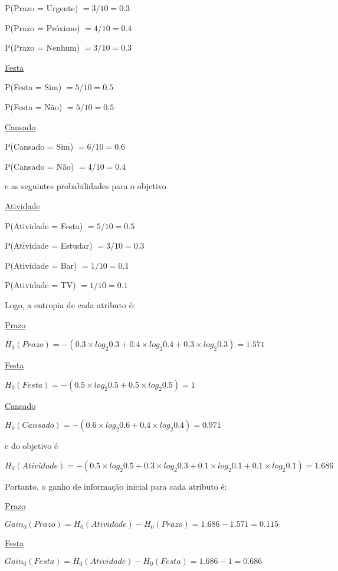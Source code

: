 \documentclass{article}
\begin{document}
\qquad P(Prazo = Urgente) $= 3/10 = 0.3$

\qquad P(Prazo = Próximo) $= 4/10 = 0.4$

\qquad P(Prazo = Nenhum) $= 3/10 = 0.3$

\bigskip
\quad \underline{Festa}

\qquad P(Festa = Sim) $= 5/10 = 0.5$

\qquad P(Festa = Não) $= 5/10 = 0.5$

\bigskip
\quad \underline{Cansado}

\qquad P(Cansado = Sim) $= 6/10 = 0.6$

\qquad P(Cansado = Não) $= 4/10 = 0.4$

\bigskip
\quad e as seguintes probabilidades para o objetivo

\quad \underline{Atividade}

\qquad P(Atividade = Festa) $= 5/10 = 0.5$

\qquad P(Atividade = Estudar) $= 3/10 = 0.3$

\qquad P(Atividade = Bar) $= 1/10 = 0.1$

\qquad P(Atividade = TV) $= 1/10 = 0.1$

\bigskip
\quad Logo, a entropia de cada atributo é:

\bigskip
\quad \underline{Prazo}

\qquad $H_{0}(Prazo) = -(0.3 \times log_{2}0.3 + 0.4 \times log_{2}0.4 + 0.3 \times log_{2}0.3) = 1.571$

\bigskip
\quad \underline{Festa}

\qquad $H_{0}(Festa) = -(0.5 \times log_{2}0.5 + 0.5 \times log_{2}0.5) = 1$

\bigskip
\quad \underline{Cansado}

\qquad $H_{0}(Cansado) = -(0.6 \times log_{2}0.6 + 0.4 \times log_{2}0.4) = 0.971$

\bigskip
\quad e do objetivo é

\qquad $H_{0}(Atividade) = -(0.5 \times log_{2}0.5 + 0.3 \times log_{2}0.3 + 0.1 \times log_{2}0.1 + 0.1 \times log_{2}0.1) = 1.686$

\bigskip
\quad Portanto, o ganho de informação inicial para cada atributo é:

\bigskip
\quad \underline{Prazo}

\qquad $Gain_{0}(Prazo) = H_{0}(Atividade) - H_{0}(Prazo) = 1.686 - 1.571 = 0.115$

\quad \underline{Festa}

\qquad $Gain_{0}(Festa) = H_{0}(Atividade) - H_{0}(Festa) = 1.686 - 1 = 0.686$
\end{document}
